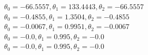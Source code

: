 \documentclass[11pt]{article} %
\begin{document}
\begin{figure}[h]
\qquad
{}
\end{figure}
\(\theta_0= -66.5557, \theta_1= 133.4443 , \theta_2= -66.5557\)\\
\(\theta_0= -0.4855, \theta_1= 1.3504 , \theta_2= -0.4855\)\\
\(\theta_0= -0.0067, \theta_1= 0.9951 , \theta_2= -0.0067\)\\
\(\theta_0= -0.0, \theta_1= 0.995 , \theta_2= -0.0\)\\
\(\theta_0= -0.0, \theta_1= 0.995 , \theta_2= -0.0\)\\
\end{document}
